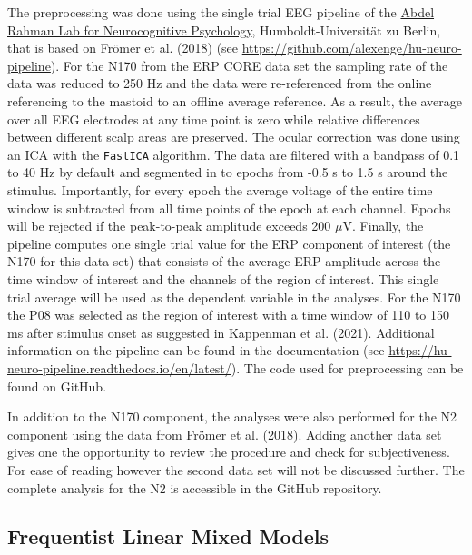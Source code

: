 \documentclass[
  doc,12pt,floatsintext]{apa7}
\begin{document}
The preprocessing was done using the single trial EEG pipeline of the \href{https://abdelrahmanlab.com/}{Abdel Rahman Lab for Neurocognitive Psychology}, Humboldt-Universität zu Berlin, that is based on Frömer et al. (2018) (see \url{https://github.com/alexenge/hu-neuro-pipeline}). For the N170 from the ERP CORE data set the sampling rate of the data was reduced to 250 Hz and the data were re-referenced from the online referencing to the mastoid to an offline average reference. As a result, the average over all EEG electrodes at any time point is zero while relative differences between different scalp areas are preserved. The ocular correction was done using an ICA with the \texttt{FastICA} algorithm. The data are filtered with a bandpass of 0.1 to 40 Hz by default and segmented in to epochs from -0.5 s to 1.5 s around the stimulus. Importantly, for every epoch the average voltage of the entire time window is subtracted from all time points of the epoch at each channel. Epochs will be rejected if the peak-to-peak amplitude exceeds 200 \(\mu\)V. Finally, the pipeline computes one single trial value for the ERP component of interest (the N170 for this data set) that consists of the average ERP amplitude across the time window of interest and the channels of the region of interest. This single trial average will be used as the dependent variable in the analyses. For the N170 the P08 was selected as the region of interest with a time window of 110 to 150 ms after stimulus onset as suggested in Kappenman et al. (2021). Additional information on the pipeline can be found in the documentation (see \url{https://hu-neuro-pipeline.readthedocs.io/en/latest/}). The code used for preprocessing can be found on GitHub.

In addition to the N170 component, the analyses were also performed for the N2 component using the data from Frömer et al. (2018). Adding another data set gives one the opportunity to review the procedure and check for subjectiveness. For ease of reading however the second data set will not be discussed further. The complete analysis for the N2 is accessible in the GitHub repository.

\subsection{Frequentist Linear Mixed Models}\label{frequentist-linear-mixed-models}
\end{document}
